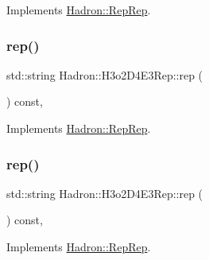 Implements \mbox{\hyperlink{structHadron_1_1RepRep_ab3213025f6de249f7095892109575fde}{Hadron\+::\+Rep\+Rep}}.

\mbox{\label{structHadron_1_1H3o2D4E3Rep_ab7eff64255c6e04c36a08a7222b349ad}} 
\subsubsection{\texorpdfstring{rep()}{rep()}\hspace{0.1cm}{\footnotesize\ttfamily [2/5]}}
{\footnotesize\ttfamily std\+::string Hadron\+::\+H3o2\+D4\+E3\+Rep\+::rep (\begin{DoxyParamCaption}{ }\end{DoxyParamCaption}) const\hspace{0.3cm}{\ttfamily [inline]}, {\ttfamily [virtual]}}



Implements \mbox{\hyperlink{structHadron_1_1RepRep_ab3213025f6de249f7095892109575fde}{Hadron\+::\+Rep\+Rep}}.

\mbox{\label{structHadron_1_1H3o2D4E3Rep_ab7eff64255c6e04c36a08a7222b349ad}} 
\subsubsection{\texorpdfstring{rep()}{rep()}\hspace{0.1cm}{\footnotesize\ttfamily [3/5]}}
{\footnotesize\ttfamily std\+::string Hadron\+::\+H3o2\+D4\+E3\+Rep\+::rep (\begin{DoxyParamCaption}{ }\end{DoxyParamCaption}) const\hspace{0.3cm}{\ttfamily [inline]}, {\ttfamily [virtual]}}



Implements \mbox{\hyperlink{structHadron_1_1RepRep_ab3213025f6de249f7095892109575fde}{Hadron\+::\+Rep\+Rep}}.

\mbox{\label{structHadron_1_1H3o2D4E3Rep_ab7eff64255c6e04c36a08a7222b349ad}} 
